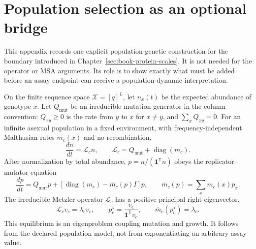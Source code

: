 \section{Population selection as an optional bridge}

This appendix records one explicit population-genetic construction for the boundary introduced in
Chapter~\ref{sec:book-protein-scales}.  It is not needed for the operator or MSA arguments.  Its role
is to show exactly what must be added before an assay endpoint can receive a population-dynamic
interpretation.

On the finite sequence space $\mathcal X=[q]^L$, let $n_x(t)$ be the expected abundance of genotype
$x$.  Let $Q_{\mathrm{mut}}$ be an irreducible mutation generator in the column convention:
$Q_{xy}\geq0$ is the rate from $y$ to $x$ for $x\neq y$, and $\sum_xQ_{xy}=0$.  For an infinite
asexual population in a fixed environment, with frequency-independent Malthusian rates $m_c(x)$ and
no recombination,
\begin{equation}
\frac{dn}{dt}=\mathcal L_cn,
\qquad
\mathcal L_c=Q_{\mathrm{mut}}+\operatorname{diag}(m_c).
\label{eq:book-mutation-selection-operator}
\end{equation}
After normalization by total abundance, $p=n/(\mathbf1^{\mathsf T}n)$ obeys the
replicator--mutator equation
\begin{equation}
\frac{dp}{dt}=Q_{\mathrm{mut}}p+
\left[\operatorname{diag}(m_c)-\overline m_c(p)I\right]p,
\qquad
\overline m_c(p)=\sum_xm_c(x)p_x.
\label{eq:book-replicator-mutator-equation}
\end{equation}
The irreducible Metzler operator $\mathcal L_c$ has a positive principal right eigenvector,
\begin{equation}
\mathcal L_cv_c=\lambda_cv_c,
\qquad
p_c^\star=\frac{v_c}{\mathbf1^{\mathsf T}v_c},
\qquad
\overline m_c(p_c^\star)=\lambda_c.
\label{eq:book-mutation-selection-perron-equilibrium}
\end{equation}
This equilibrium is an eigenproblem coupling mutation and growth.  It follows from the declared
population model, not from exponentiating an arbitrary assay value.

